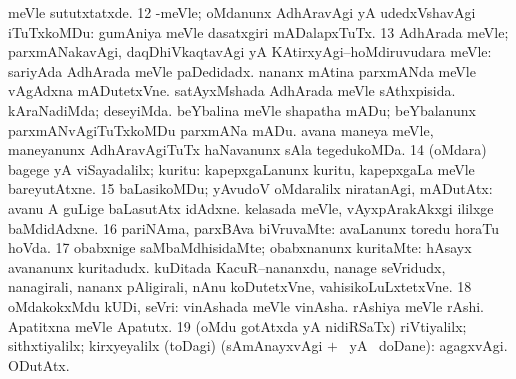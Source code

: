 {{meVle sututxtatxde.
\num{12} -meVle; oMdanunx AdhAravAgi yA udedxVshavAgi iTuTxkoMDu:
 gumAniya meVle dasatxgiri mADalapxTuTx.
\num{13} AdhArada meVle; parxmANakavAgi, daqDhiVkaqtavAgi yA
KAtirxyAgi--hoMdiruvudara meVle: 
sariyAda AdhArada meVle paDedidadx.  nananx
mAtina parxmANda meVle vAgAdxna mADutetxVne. 
satAyxMshada AdhArada meVle sAthxpisida. 
kAraNadiMda; deseyiMda.  beYbalina meVle
shapatha mADu; beYbalanunx parxmANvAgiTuTxkoMDu parxmANa mADu. 
 avana maneya meVle, maneyanunx
AdhAravAgiTuTx haNavanunx sAla tegedukoMDa.
\num{14} (oMdara) bagege yA viSayadalilx; kuritu:  kapepxgaLanunx kuritu, kapepxgaLa meVle bareyutAtxne.
\num{15} baLasikoMDu; yAvudoV oMdaralilx niratanAgi, mADutAtx:
 avanu A guLige baLasutAtx idAdxne.  kelasada meVle, vAyxpArakAkxgi ililxge baMdidAdxne.
\num{16} pariNAma, parxBAva biVruvaMte: 
avaLanunx toredu horaTu hoVda.
\num{17} obabxnige saMbaMdhisidaMte; obabxnanunx kuritaMte:  hAsayx avananunx kuritadudx.  kuDitada KacuR--nananxdu, nanage seVridudx, nanagirali, nananx
pAligirali, nAnu koDutetxVne, vahisikoLuLxtetxVne.
\num{18} oMdakokxMdu kUDi, seVri:  vinAshada meVle
vinAsha.  rAshiya meVle rAshi. 
Apatitxna meVle Apatutx.
\num{19} (oMdu gotAtxda yA nidiRSaTx) riVtiyalilx; sithxtiyalilx;
kirxyeyalilx (toDagi) (sAmAnayxvAgi  $+$ \gu\ yA \nA\ doDane):
 agagxvAgi.  ODutAtx.}}

